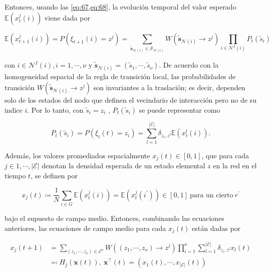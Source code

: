 Entonces, usando las \cref{eq:67,eq:68}, la evolución temporal del valor esperado  $\mathbb{E}\left(x_t^j(i)\right) $  viene dada por

\begin{equation}\label{eq:70}
	\mathbb{E}\left(x_{t+1}^j(i)\right) = P\left(\xi_{t+1}(i)=z^j\right) = \sum_{\tilde{\mathbf{s}}_{\mathcal{N}(i)}\in\mathcal{S}_{\mathcal{N}(i)}}{W\left(\tilde{\mathbf{s}}_{\mathcal{N}(i)}\to z^j\right)\prod_{i\in\mathcal{N}^I(i)}}{P_t(\tilde{s}_i)} 
\end{equation}

con $i\in\mathcal{N}^I(i),i=1,\cdots,\nu$ y $\tilde{\mathbf{s}}_{\mathcal{N}(i)}=(\tilde{s}_1,\cdots,\tilde{s}_\nu)$. De acuerdo con la homogeneidad espacial de la regla de transición local, las probabilidades de transición $W\left(\tilde{\mathbf{s}}_{\mathcal{N}(i)}\to z^j\right)$  son invariantes a la traslación; es decir, dependen solo de los estados del nodo que definen el vecindario de interacción pero no de su indice $i$. Por lo tanto, con $\tilde{s}_i=z_{i}$ , $P_t(\tilde{s}_i)$ se puede representar como

\begin{equation}\label{eq:71}
	P_t(\tilde{s}_i)=P(\xi_i(t)=z_i)=\sum_{l=1}^{\left| \mathcal{E}\right| }{\delta_{z_i,z^l}\mathbb{E}\left(x_t^l(i)\right)}.
\end{equation}


Además, los valores promediados espacialmente $x_j(t) \in [0, 1]$, que para cada $j \in  {1, \cdots,\left| \mathcal{E}\right| }$ denotan la densidad esperada de un estado elemental $z$ en la red en el tiempo $t$, se definen por

\begin{equation}\label{eq:72}
	x_j(t) \coloneqq \frac{1}{N} \sum_{i\in G}{\mathbb{E}\left(x_t^j(i)\right)}=\mathbb{E}\left(x_t^j(i^\prime)\right)\in[0,1] \ \text{para un cierto} \ r^{\prime}
\end{equation}

bajo el supuesto de campo medio. Entonces, combinando las ecuaciones anteriores, las ecuaciones de campo medio para cada $x_j(t)$ están dadas por

\begin{align}\label{eq:73}
	x_j(t+1) &= \sum_{(z_1,\cdots,z_\nu)\in\mathcal{E}^\nu}{W\left(\left(z_1,\cdots,z_\nu\right)\to z^j\right)\prod_{i=1}^{\nu}{\sum_{l=1}^{\left|\mathcal{E} \right| } \delta_{z_i,z^l}x_l(t)}}\\
	&\eqqcolon H_j(\mathbf{x}(t)), \  \mathbf{x}^\top(t)=\left(x_1(t),\cdots,x_{\left| \mathcal{E}\right| }(t)\right)
\end{align}

